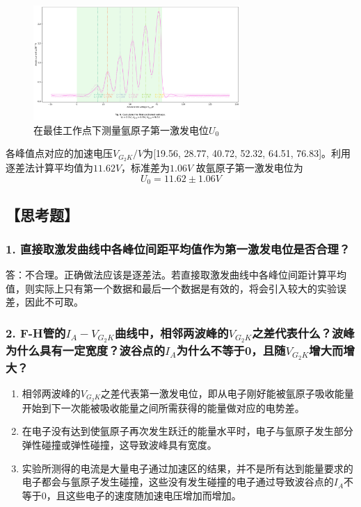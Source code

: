 \documentclass[12pt,a4paper,UTF8]{ctexart}
\begin{document}
	\begin{figure}[htbp]
		\centering
		\includegraphics[width=0.7\textwidth]{attachments/fig.9.png}
		\caption{在最佳工作点下测量氩原子第一激发电位$U_0$}
		\label{fig:9}
	\end{figure}
	各峰值点对应的加速电压$V_{G_2K}/V$为[19.56, 28.77, 40.72, 52.32, 64.51, 76.83]。利用逐差法计算平均值为$11.62V$，标准差为$1.06V$
	故氩原子第一激发电位为
	$$
	U_0=11.62 \pm 1.06 V
	$$


\subsection*{【思考题】}
	\subsubsection*{1. 直接取激发曲线中各峰位间距平均值作为第一激发电位是否合理？}
		答：不合理。正确做法应该是逐差法。若直接取激发曲线中各峰位间距计算平均值，则实际上只有第一个数据和最后一个数据是有效的，将会引入较大的实验误差，因此不可取。
	\subsubsection*{2. F-H管的$I_A-V_{G_2K}$曲线中，相邻两波峰的$V_{G_2K}$之差代表什么？波峰为什么具有一定宽度？波谷点的$I_A$为什么不等于0，且随$V_{G_2K}$增大而增大？}
		\begin{enumerate}[label=\arabic*.]
			\item 相邻两波峰的$V_{G_2K}$之差代表第一激发电位，即从电子刚好能被氩原子吸收能量开始到下一次能被吸收能量之间所需获得的能量做对应的电势差。
			\item 在电子没有达到使氩原子再次发生跃迁的能量水平时，电子与氩原子发生部分弹性碰撞或弹性碰撞，这导致波峰具有宽度。
			\item 实验所测得的电流是大量电子通过加速区的结果，并不是所有达到能量要求的电子都会与氩原子发生碰撞，这些没有发生碰撞的电子通过导致波谷点的$I_A$不等于0，且这些电子的速度随加速电压增加而增加。
		\end{enumerate}
\end{document}

